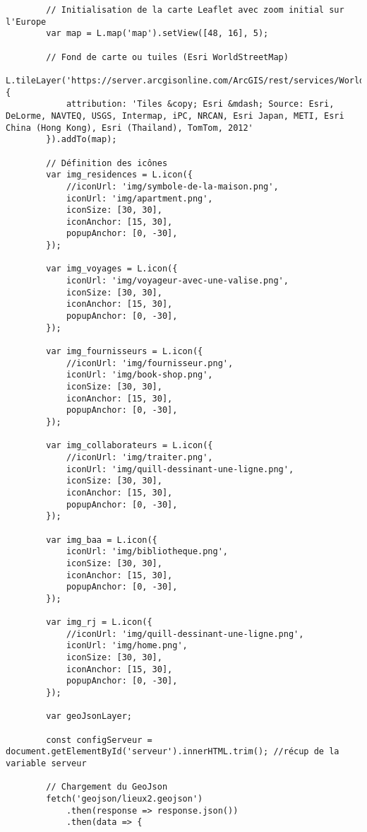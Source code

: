 \begin{verbatim}
        // Initialisation de la carte Leaflet avec zoom initial sur l'Europe
        var map = L.map('map').setView([48, 16], 5);

        // Fond de carte ou tuiles (Esri WorldStreetMap)
        L.tileLayer('https://server.arcgisonline.com/ArcGIS/rest/services/World_Street_Map/MapServer/tile/{z}/{y}/{x}', {
            attribution: 'Tiles &copy; Esri &mdash; Source: Esri, DeLorme, NAVTEQ, USGS, Intermap, iPC, NRCAN, Esri Japan, METI, Esri China (Hong Kong), Esri (Thailand), TomTom, 2012'
        }).addTo(map);

        // Définition des icônes
        var img_residences = L.icon({
            //iconUrl: 'img/symbole-de-la-maison.png',
            iconUrl: 'img/apartment.png',
            iconSize: [30, 30],
            iconAnchor: [15, 30],
            popupAnchor: [0, -30],
        });

        var img_voyages = L.icon({
            iconUrl: 'img/voyageur-avec-une-valise.png',
            iconSize: [30, 30],
            iconAnchor: [15, 30],
            popupAnchor: [0, -30],
        });

        var img_fournisseurs = L.icon({
            //iconUrl: 'img/fournisseur.png',
            iconUrl: 'img/book-shop.png',
            iconSize: [30, 30],
            iconAnchor: [15, 30],
            popupAnchor: [0, -30],
        });

        var img_collaborateurs = L.icon({
            //iconUrl: 'img/traiter.png',
            iconUrl: 'img/quill-dessinant-une-ligne.png',
            iconSize: [30, 30],
            iconAnchor: [15, 30],
            popupAnchor: [0, -30],
        });

        var img_baa = L.icon({
            iconUrl: 'img/bibliotheque.png',
            iconSize: [30, 30],
            iconAnchor: [15, 30],
            popupAnchor: [0, -30],
        });

        var img_rj = L.icon({
            //iconUrl: 'img/quill-dessinant-une-ligne.png',
            iconUrl: 'img/home.png',
            iconSize: [30, 30],
            iconAnchor: [15, 30],
            popupAnchor: [0, -30],
        });

        var geoJsonLayer;
        
        const configServeur = document.getElementById('serveur').innerHTML.trim(); //récup de la variable serveur   

        // Chargement du GeoJson
        fetch('geojson/lieux2.geojson')
            .then(response => response.json())
            .then(data => {
                

\end{verbatim}
